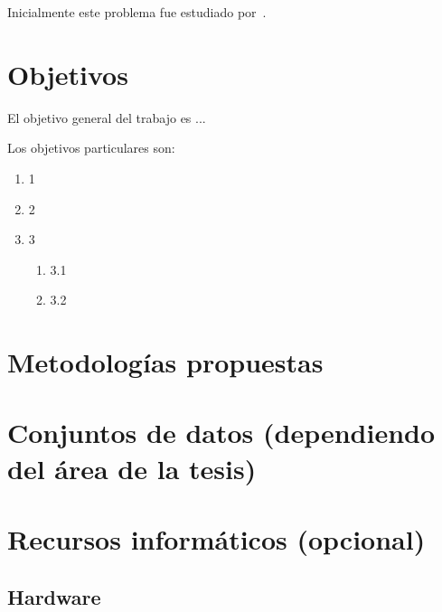\documentclass[12pt]{article}
\begin{document}
Inicialmente este problema fue estudiado por~\cite{knuth2014art}.

\bigskip


\section{Objetivos}

El objetivo general del trabajo es ...

Los objetivos particulares son:

\begin{enumerate}
    \item 1
    \item 2
    \item 3
          \begin{enumerate}
              \item 3.1
              \item 3.2
          \end{enumerate}
\end{enumerate}

\bigskip


\section{Metodologías propuestas}

\bigskip


\section{Conjuntos de datos (dependiendo del área de la tesis)}

\bigskip


\section{Recursos informáticos (opcional)}

\subsection{Hardware}
\end{document}
